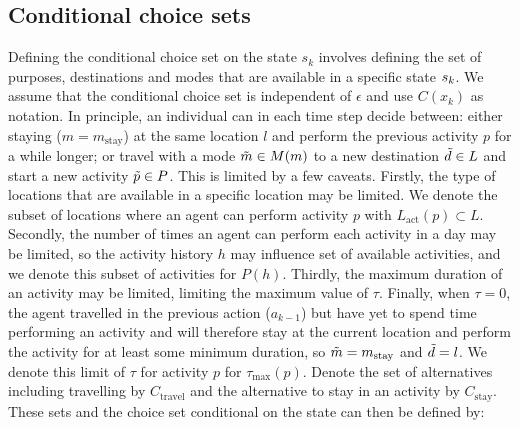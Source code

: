 \subsection{Conditional choice sets}
Defining the conditional choice set on the state $s_k$ involves defining the set of purposes, destinations and modes that are available in a specific state $s_{k}$. We assume that the conditional choice set is independent of $\epsilon$ and use $C(x_{k})$ as notation.
In principle, an individual can in each time step decide between: either staying ($m=m_\text{stay}$) at the same location $l$ and perform the previous activity $p$ for a while longer; or travel with a mode $\tilde{m}\in M(m)$ to a new destination $\tilde{d} \in L$ and start a new activity $\tilde{p} \in P$. This is limited by a few caveats. Firstly, the type of locations that are available in a specific location may be limited. We denote the subset of locations where an agent can perform activity $p$ with $L_\text{act}(p)\subset L$. Secondly, the number of times an agent can perform each activity in a day may be limited, so the activity history $h$ may influence set of available activities, and we denote this subset of activities for $P(h)$. 
Thirdly, the maximum duration of an activity may be limited, limiting the maximum value of $\tau$. Finally, when $\tau=0$, the agent travelled in the previous action ($a_{k-1}$) but have yet to spend time performing an activity and will therefore stay at the current location and perform the activity for at least some minimum duration, so $\tilde{m} = m_{\text{stay}}$ and $\tilde{d}=l$.  We denote this limit of $\tau$ for activity $p$ for $\tau_\text{max}(p)$. Denote the set of alternatives including travelling by $C_\text{travel}$ and the alternative to stay in an activity by $C_\text{stay}$. These sets and the choice set conditional on the state can then be defined by:
